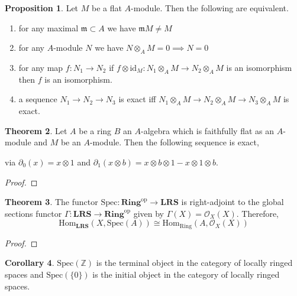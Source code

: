 \documentclass[12pt]{article}
\newcommand{\Z}{\mathbb{Z}}
\newcommand{\id}{\mathrm{id}}
\newcommand{\Homover}[3]{\mathrm{Hom}_{#1} \left( #2, #3 \right)}
\newcommand{\Spec}[1]{\mathrm{Spec}\left( #1 \right)}
\newcommand{\m}{\mathfrak{m}}
\newcommand{\op}{\mathrm{op}}
\theoremstyle{remark}
\theoremstyle{definition}
\newtheorem{theorem}{Theorem}[section]
\newtheorem{proposition}[theorem]{Proposition}
\newtheorem{corollary}[theorem]{Corollary}
\begin{document}
\begin{proposition}
Let $M$ be a flat $A$-module. Then the following are equivalent. 
\begin{enumerate}
\item for any maximal $\m \subset A$ we have $\m M \neq M$
\item for any $A$-module $N$ we have $N \otimes_A M = 0 \implies N = 0$
\item for any map $f : N_1 \to N_2$ if $f \otimes \id_M : N_1 \otimes_A M \to N_2 \otimes_A M$ is an isomorphism then $f$ is an isomorphism.
\item a sequence $N_1 \to N_2 \to N_3$ is exact iff $N_1 \otimes_A M \to N_2 \otimes_A M \to N_3 \otimes_A M$ is exact. 
\end{enumerate}
\end{proposition}


\begin{theorem}
Let $A$ be a ring $B$ an $A$-algebra which is faithfully flat as an $A$-module and $M$ be an $A$-module. Then the following sequence is exact,
\begin{center}
\end{center}
via $\partial_0(x) = x \otimes 1$ and $\partial_1(x \otimes b) = x \otimes b \otimes 1 - x \otimes 1 \otimes b$.
\end{theorem}

\begin{proof}

\end{proof}

\begin{theorem}
The functor $\mathrm{Spec} : \mathbf{Ring}^{\op} \to \mathbf{LRS}$ is right-adjoint to the global sections functor $\Gamma : \mathbf{LRS} \to \mathbf{Ring}^{\op}$ given by $\Gamma(X) = \mathcal{O}_X(X)$. Therefore,
\[ \Homover{\mathbf{LRS}}{X}{\Spec{A}} \cong \Homover{\mathrm{Ring}}{A}{\mathcal{O}_X(X)} \] 
\end{theorem}

\begin{proof}

\end{proof}

\begin{corollary}
$\Spec{\Z}$ is the terminal object in the category of locally ringed spaces and $\Spec{\{ 0 \}}$ is the initial object in the category of locally ringed spaces. 
\end{corollary}
\end{document}
